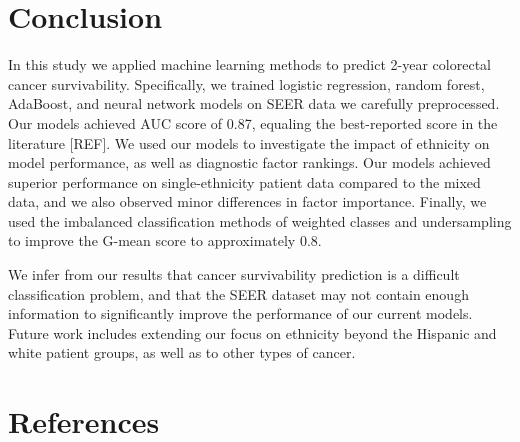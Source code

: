 \documentclass[review]{elsarticle}
\begin{document}
\section{Conclusion}
In this study we applied machine learning methods to predict 2-year colorectal cancer survivability. Specifically, we trained logistic regression, random forest, AdaBoost, and neural network models on SEER data we carefully preprocessed. Our models achieved AUC score of 0.87, equaling the best-reported score in the literature [REF]. We used our models to investigate the impact of ethnicity on model performance, as well as diagnostic factor rankings. Our models achieved superior performance on single-ethnicity patient data compared to the mixed data, and we also observed minor differences in factor importance. Finally, we used the imbalanced classification methods of weighted classes and undersampling to improve the G-mean score to approximately 0.8. 

We infer from our results that cancer survivability prediction is a difficult classification problem, and that the SEER dataset may not contain enough information to significantly improve the performance of our current models. Future work includes extending our focus on ethnicity beyond the Hispanic and white patient groups, as well as to other types of cancer.


\section*{References}


\end{document}
